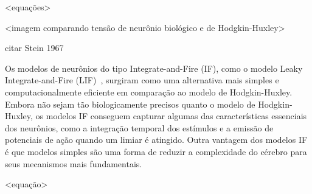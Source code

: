 <equações>

<imagem comparando tensão de neurônio biológico e de Hodgkin-Huxley>

citar Stein 1967

Os modelos de neurônios do tipo Integrate-and-Fire (IF), como o modelo Leaky Integrate-and-Fire (LIF)~\cite{burkitt2006review},
surgiram como uma alternativa mais simples e computacionalmente eficiente em comparação ao modelo de Hodgkin-Huxley. Embora não
sejam tão biologicamente precisos quanto o modelo de Hodgkin-Huxley, os modelos IF conseguem capturar algumas das características
essenciais dos neurônios, como a integração temporal dos estímulos e a emissão de potenciais de ação quando um limiar é atingido.
Outra vantagem dos modelos IF é que modelos simples são uma forma de reduzir a complexidade do cérebro para seus mecanismos mais
fundamentais.

<equação>